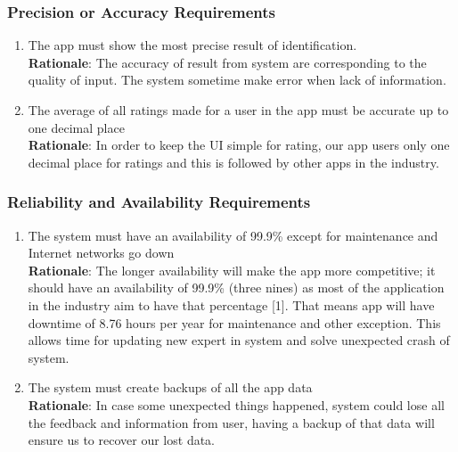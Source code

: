 \subsubsection{Precision or Accuracy Requirements}
\label{ssub:precision_or_accuracy_requirements}
\begin{enumerate}[{PR-PA}1. ]
	\item The app must show the most precise result of identification.
	\\ \textbf{Rationale}: The accuracy of result from system are corresponding to the quality of input. The system sometime make error when lack of information.
	\item The average of all ratings made for a user in the app must be accurate up to one decimal place
	\\ \textbf{Rationale}: In order to keep the UI simple for rating, our app users only one decimal place for ratings and this is followed by other apps in the industry. 
\end{enumerate}

\subsubsection{Reliability and Availability Requirements}
\label{ssub:reliability_and_availability_requirements}
\begin{enumerate}[{PR-RA}1. ]
	\item The system must have an availability of 99.9\% except for maintenance and Internet networks go down
	\\ \textbf{Rationale}: The longer availability will make the app more competitive; it should have an availability of 99.9\% (three nines) as most of the application in the industry aim to have that percentage [1]. That means app will have downtime of 8.76 hours per year for maintenance and other exception. This allows time for updating new expert in system and solve unexpected crash of system.
	\item The system must create backups of all the app data
	\\ \textbf{Rationale}: In case some unexpected things happened, system could lose all the feedback and information from user, having a backup of that data will ensure us to recover our lost data.
\end{enumerate}


